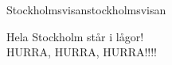 \begin{song}{Stockholmsvisan}{stockholmsvisan}
\begin{vers}
Hela Stockholm står i lågor!\\
HURRA, HURRA, HURRA!!!!\\
\end{vers}
\end{song}

